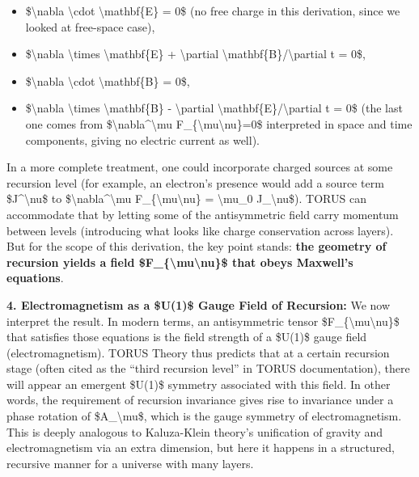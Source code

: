 \documentclass[
]{article}
\begin{document}
\begin{itemize}
\item
  \$\textbackslash nabla \textbackslash cdot \textbackslash mathbf\{E\}
  = 0\$ (no free charge in this derivation, since we looked at
  free-space case),
\item
  \$\textbackslash nabla \textbackslash times \textbackslash mathbf\{E\}
  + \textbackslash partial
  \textbackslash mathbf\{B\}/\textbackslash partial t = 0\$,
\item
  \$\textbackslash nabla \textbackslash cdot \textbackslash mathbf\{B\}
  = 0\$,
\item
  \$\textbackslash nabla \textbackslash times \textbackslash mathbf\{B\}
  - \textbackslash partial
  \textbackslash mathbf\{E\}/\textbackslash partial t = 0\$ (the last
  one comes from \$\textbackslash nabla\^{}\textbackslash mu
  F\_\{\textbackslash mu\textbackslash nu\}=0\$ interpreted in space and
  time components, giving no electric current as well).
\end{itemize}

In a more complete treatment, one could incorporate charged sources at
some recursion level (for example, an electron's presence would add a
source term \$J\^{}\textbackslash nu\$ to
\$\textbackslash nabla\^{}\textbackslash mu
F\_\{\textbackslash mu\textbackslash nu\} = \textbackslash mu\_0
J\_\textbackslash nu\$). TORUS can accommodate that by letting some of
the antisymmetric field carry momentum between levels (introducing what
looks like charge conservation across layers). But for the scope of this
derivation, the key point stands: \textbf{the geometry of recursion
yields a field \$F\_\{\textbackslash mu\textbackslash nu\}\$ that obeys
Maxwell's equations}\hspace{0pt}.

\textbf{4. Electromagnetism as a \$U(1)\$ Gauge Field of Recursion:} We
now interpret the result. In modern terms, an antisymmetric tensor
\$F\_\{\textbackslash mu\textbackslash nu\}\$ that satisfies those
equations is the field strength of a \$U(1)\$ gauge field
(electromagnetism). TORUS Theory thus predicts that at a certain
recursion stage (often cited as the ``third recursion level'' in TORUS
documentation), there will appear an emergent \$U(1)\$ symmetry
associated with this field\hspace{0pt}. In other words, the requirement
of recursion invariance gives rise to invariance under a phase rotation
of \$A\_\textbackslash mu\$, which is the gauge symmetry of
electromagnetism. This is deeply analogous to Kaluza-Klein theory's
unification of gravity and electromagnetism via an extra dimension, but
here it happens in a structured, recursive manner for a universe with
many layers.
\end{document}

